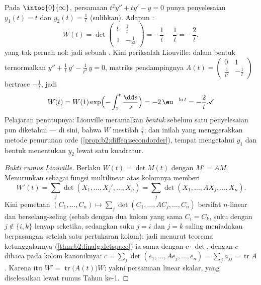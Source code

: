 \begin{example}\label{ex:b2:diffeq:eulerwronskian}
Pada $\intoo{0}{\infty}$, persamaan $t^2y'' + ty' - y = 0$ punya
penyelesaian $y_1(t) = t$ dan $y_2(t) = \frac1t$ (sulihkan).
Adapun :
\[
W(t) = \det\begin{pmatrix} t & \tfrac1t\\[2pt]
1 & -\tfrac{1}{t^2}\end{pmatrix}
= -\frac1t - \frac1t = -\frac2t ,
\]
yang tak pernah nol: jadi sebuah . Kini periksalah Liouville: dalam
bentuk ternormalkan $y'' + \frac1t\,y' - \frac{1}{t^2}\,y = 0$,
matriks pendampingnya $A(t) = \begin{pmatrix} 0 & 1\\ \frac{1}{t^2}
& -\frac1t\end{pmatrix}$ bertrace $-\frac1t$, jadi
\[
W(t) = W(1)\exp\Bigl(-\int_1^t\frac{\dd s}{s}\Bigr)
= -2\,\eu^{-\ln t} = -\frac2t . \checkmark
\]
Pelajaran penutupnya: Liouville meramalkan \emph{bentuk}
 sebelum satu penyelesaian pun diketahui --- di sini, bahwa $W$ mestilah
$\frac{c}{t}$; dan inilah yang menggerakkan metode
penurunan orde
(\cref{prop:b2:diffeq:secondorder}), tempat mengetahui $y_1$ dan
bentuk  menentukan $y_2$ lewat satu kuadratur.
\end{example}

\begin{proof}[Bukti rumus Liouville]
Berlaku $W(t) = \det M(t)$ dengan $M' = AM$. Menurunkan 
sebagai fungsi multilinear atas kolomnya memberi
\[
W'(t) = \sum_j \det(X_1, \dots, X_j', \dots, X_n)
= \sum_j \det(X_1, \dots, AX_j, \dots, X_n) .
\]
Kini pemetaan $(C_1, \dots, C_n) \mapsto \sum_j \det(C_1, \dots,
AC_j, \dots, C_n)$ bersifat $n$-linear dan berselang-seling (sebab dengan dua kolom yang sama
$C_i = C_k$, suku dengan $j \notin \{i, k\}$ lenyap seketika,
sedangkan suku $j = i$ dan $j = k$ saling meniadakan berpasangan setelah satu
pertukaran kolom): jadi menurut teorema ketunggalannya
(\cref{thm:b2:linalg:detspace}) ia sama dengan $c \cdot \det$, dengan $c$ dibaca
pada kolom kanoniknya: $c = \sum_j \det(e_1, \dots, Ae_j, \dots,
e_n) = \sum_j a_{jj} = \operatorname{tr} A$. Karena itu $W' =
\operatorname{tr}\bigl(A(t)\bigr)W$: yakni persamaan  linear skalar, yang diselesaikan
lewat rumus Tahun ke-1.
\end{proof}

